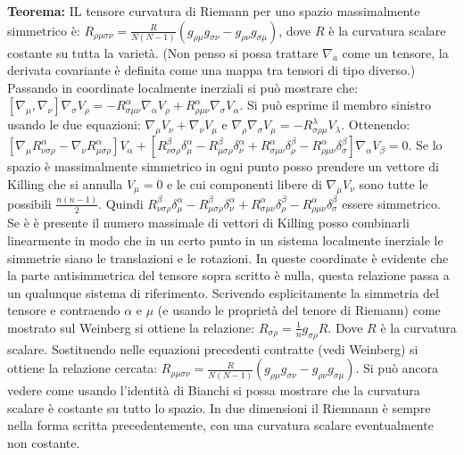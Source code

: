 \documentclass[10pt,a4paper]{article}
\begin{document}
\textbf{Teorema:} IL tensore curvatura di Riemann per uno spazio massimalmente simmetrico è: $R_{\rho \mu \sigma \nu} = \frac{R}{N(N-1)} (g_{\rho \mu} g_{\sigma \nu} - g_{\rho \nu} g_{\sigma \mu})$, dove $R$ è la curvatura scalare costante su tutta la varietà.
(Non penso si possa trattare $\nabla_a$ come un tensore, la derivata covariante è definita come una mappa tra tensori di tipo diverso.)
Passando in coordinate localmente inerziali si può mostrare che: $[\nabla_{\mu}, \nabla_{\nu}] \nabla_{\sigma} V_{\rho} = -R^{\alpha}_{\sigma \mu \nu} \nabla_{\alpha} V_{\rho} + R^{\alpha}_{\rho \mu \nu} \nabla_{\sigma} V_{\alpha}$. 
Si può esprime il membro sinistro usando le due equazioni: 
$\nabla_{\mu} V_{\nu} + \nabla_{\nu} V_{\mu}$ e $\nabla_{\rho} \nabla_{\sigma} V_{\mu} = 
-R^{\lambda}_{\sigma \rho \mu} V_{\lambda}$. Ottenendo: $[\nabla_{\mu} R^{\alpha}_{\nu \sigma
 \rho} - \nabla_{\nu} R^{\alpha}_{\mu \sigma \rho}] V_{\alpha}+[R^{\beta}_{\nu \sigma \rho}
 \delta^{\alpha}_{\mu} -R^{\beta}_{\mu \sigma \rho} \delta^{\alpha}_{\nu} + R^{\alpha}_{\sigma
  \mu \nu} \delta^{\beta}_{\rho} -R^{\alpha}_{\rho \mu \nu} \delta^{\beta}_{\sigma}]
   \nabla_{\alpha}
  V_{\beta} = 0$. 
Se lo spazio è massimalmente simmetrico in ogni punto posso prendere un vettore di Killing che si annulla $V_{\mu} = 0$ e le cui componenti libere di $\nabla_{\mu} V_{\nu}$ sono tutte le possibili $\frac{n(n-1)}{2}$. 
Quindi $R^{\beta}_{\nu \sigma \rho} \delta^{\alpha}_{\mu} -R^{\beta}_{\mu \sigma \rho} \delta^{\alpha}_{\nu} + R^{\alpha}_{\sigma \mu \nu} \delta^{\beta}_{\rho} -R^{\alpha}_{\rho \mu \nu} \delta^{\beta}_{\sigma}$ essere simmetrico. 
Se è è presente il numero massimale di vettori di Killing posso combinarli linearmente in modo che in un certo punto in un sistema localmente inerziale le simmetrie siano le translazioni e le rotazioni. In queste coordinate è evidente che la parte antisimmetrica del tensore sopra scritto è nulla, questa relazione passa a un qualunque sistema di riferimento. 
Scrivendo esplicitamente la simmetria del tensore e contraendo $\alpha$ e $\mu$ (e usando le proprietà del tenore di Riemann) come mostrato sul Weinberg si ottiene la relazione: $R_{\sigma \rho} = \frac{1}{n} g_{\sigma \rho} R$. Dove $R$ è la curvatura scalare. Sostituendo nelle equazioni precedenti contratte (vedi Weinberg) si ottiene la relazione cercata: $R_{\rho \mu \sigma \nu} = \frac{R}{N(N-1)} (g_{\rho \mu} g_{\sigma \nu} - g_{\rho \nu} g_{\sigma \mu})$.
Si può ancora vedere come usando l'identità di Bianchi si possa mostrare che la curvatura scalare è costante su tutto lo spazio. In due dimensioni il Riemnann è sempre nella forma scritta precedentemente, con una curvatura scalare eventualmente non costante.
\end{document}
